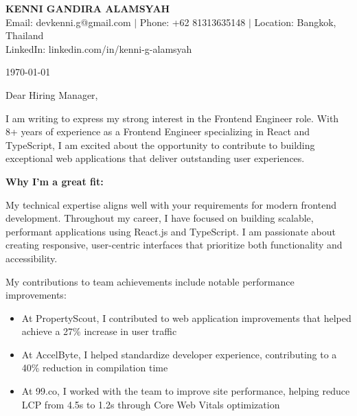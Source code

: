 \documentclass[12pt]{article}
\begin{document}
\begin{center}
    {\LARGE\textbf{KENNI GANDIRA ALAMSYAH}}\\[0.3cm]
    Email: devkenni.g@gmail.com $|$ Phone: +62 81313635148 $|$ Location: Bangkok, Thailand\\
    LinkedIn: linkedin.com/in/kenni-g-alamsyah
\end{center}

\vspace{1cm}

\today

\vspace{0.5cm}

Dear Hiring Manager,

\vspace{0.5cm}

I am writing to express my strong interest in the Frontend Engineer role. With 8+ years of experience as a Frontend Engineer specializing in React and TypeScript, I am excited about the opportunity to contribute to building exceptional web applications that deliver outstanding user experiences.

\vspace{0.3cm}

\textbf{Why I'm a great fit:}

\vspace{0.3cm}

My technical expertise aligns well with your requirements for modern frontend development. Throughout my career, I have focused on building scalable, performant applications using React.js and TypeScript. I am passionate about creating responsive, user-centric interfaces that prioritize both functionality and accessibility.

\vspace{0.3cm}

My contributions to team achievements include notable performance improvements:
\begin{itemize}
    \item At PropertyScout, I contributed to web application improvements that helped achieve a 27\% increase in user traffic
    \item At AccelByte, I helped standardize developer experience, contributing to a 40\% reduction in compilation time
    \item At 99.co, I worked with the team to improve site performance, helping reduce LCP from 4.5s to 1.2s through Core Web Vitals optimization
\end{itemize}
\end{document}
